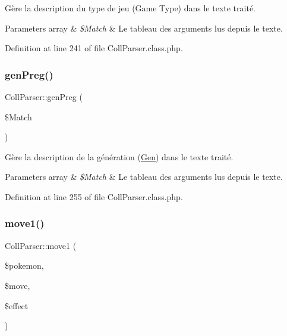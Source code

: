 Gère la description du type de jeu (Game Type) dans le texte traité.


\begin{DoxyParams}[1]{Parameters}
array & {\em \$\+Match} & Le tableau des arguments lus depuis le texte. \\
\hline
\end{DoxyParams}


Definition at line 241 of file Coll\+Parser.\+class.\+php.

\mbox{\label{class_coll_parser_aee90e9a89c8fd155d72cddf36240e347}} 
\subsubsection{\texorpdfstring{gen\+Preg()}{genPreg()}}
{\footnotesize\ttfamily Coll\+Parser\+::gen\+Preg (\begin{DoxyParamCaption}\item[{}]{\$\+Match }\end{DoxyParamCaption})\hspace{0.3cm}{\ttfamily [protected]}}

Gère la description de la génération (\hyperlink{class_gen}{Gen}) dans le texte traité.


\begin{DoxyParams}[1]{Parameters}
array & {\em \$\+Match} & Le tableau des arguments lus depuis le texte. \\
\hline
\end{DoxyParams}


Definition at line 255 of file Coll\+Parser.\+class.\+php.

\mbox{\label{class_coll_parser_a7c44afe03c478fa3e9c6ac200d0ce9a4}} 
\subsubsection{\texorpdfstring{move1()}{move1()}}
{\footnotesize\ttfamily Coll\+Parser\+::move1 (\begin{DoxyParamCaption}\item[{}]{\$pokemon,  }\item[{}]{\$move,  }\item[{}]{\$effect }\end{DoxyParamCaption})\hspace{0.3cm}{\ttfamily [protected]}}

